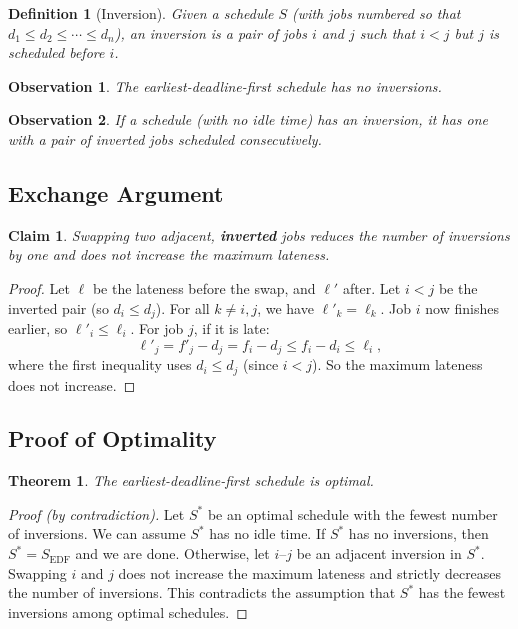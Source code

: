\documentclass[12pt,a4paper]{report}
\newtheorem{definition}{Definition}
\newtheorem{claim}{Claim}
\newtheorem{theorem}{Theorem}
\newtheorem{observation}{Observation}
\begin{document}
\begin{definition}[Inversion]
Given a schedule $S$ (with jobs numbered so that $d_1 \leq d_2 \leq \cdots \leq d_n$), an
\emph{inversion} is a pair of jobs $i$ and $j$ such that $i < j$ but $j$ is scheduled before $i$.
\end{definition}

\begin{observation}
The earliest-deadline-first schedule has no inversions.
\end{observation}

\begin{observation}
If a schedule (with no idle time) has an inversion, it has one with a pair of inverted jobs
scheduled consecutively.
\end{observation}

\subsection{Exchange Argument}

\begin{claim}
Swapping two adjacent, \textbf{inverted} jobs reduces the number of inversions by one and does not increase
the maximum lateness.
\end{claim}

\begin{proof}
Let $\ell$ be the lateness before the swap, and $\ell'$ after.
\newline
Let $i < j$ be the inverted pair
(so $d_i \leq d_j$). For all $k \neq i, j$, we have $\ell'_k = \ell_k$. Job $i$ now finishes
earlier, so $\ell'_i \leq \ell_i$. For job $j$, if it is late:
\[
    \ell'_j = f'_j - d_j = f_i - d_j \leq f_i - d_i \leq \ell_i,
\]
where the first inequality uses $d_i \leq d_j$ (since $i < j$). So the maximum lateness does
not increase.
\end{proof}

\subsection{Proof of Optimality}

\begin{theorem}
The earliest-deadline-first schedule is optimal.
\end{theorem}

\begin{proof}[Proof (by contradiction)]
Let $S^*$ be an optimal schedule with the fewest number of inversions. We can assume $S^*$ has no
idle time. If $S^*$ has no inversions, then $S^* = S_{\text{EDF}}$ and we are done. Otherwise,
let $i$--$j$ be an adjacent inversion in $S^*$. Swapping $i$ and $j$ does not increase the maximum
lateness and strictly decreases the number of inversions. This contradicts the assumption that
$S^*$ has the fewest inversions among optimal schedules.
\end{proof}
\end{document}
